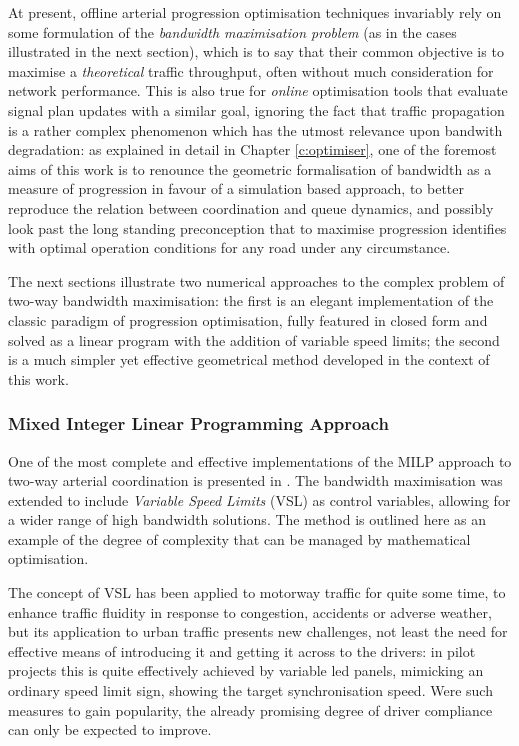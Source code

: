 At present, offline arterial progression optimisation techniques invariably rely on some formulation of the \emph{bandwidth maximisation problem} (as in the cases illustrated in the next section), which is to say that their common objective is to maximise a \emph{theoretical} traffic throughput, often without much consideration for network performance. This is also true for \emph{online} optimisation tools that evaluate signal plan updates with a similar goal, ignoring the fact that traffic propagation is a rather complex phenomenon which has the utmost relevance upon bandwith degradation: as explained in detail in Chapter \ref{c:optimiser}, one of the foremost aims of this work is to renounce the geometric formalisation of bandwidth as a measure of progression in favour of a simulation based approach, to better reproduce the relation between coordination and queue dynamics, and possibly look past the long standing preconception that to maximise progression identifies with optimal operation conditions for any road under any circumstance.

The next sections illustrate two numerical approaches to the complex problem of two-way bandwidth maximisation: the first is an elegant implementation of the classic paradigm of progression optimisation, fully featured in closed form and solved as a linear program with the addition of variable speed limits; the second is a much simpler yet effective geometrical method developed in the context of this work.

\subsubsection*{Mixed Integer Linear Programming Approach}


One of the most complete and effective implementations of the MILP approach to two-way arterial coordination is presented in \citep{de2015arterial}. The bandwidth maximisation was extended to include \emph{Variable Speed Limits} (VSL) as control variables, allowing for a wider range of high bandwidth solutions. The method is outlined here as an example of the degree of complexity that can be managed by mathematical optimisation.

The concept of VSL has been applied to motorway traffic for quite some time, to enhance traffic fluidity in response to congestion, accidents or adverse weather, but its application to urban traffic presents new challenges, not least the need for effective means of introducing it and getting it across to the drivers: in pilot projects this is quite effectively achieved by variable led panels, mimicking an ordinary speed limit sign, showing the target synchronisation speed. Were such measures to gain popularity, the already promising degree of driver compliance can only be expected to improve.

